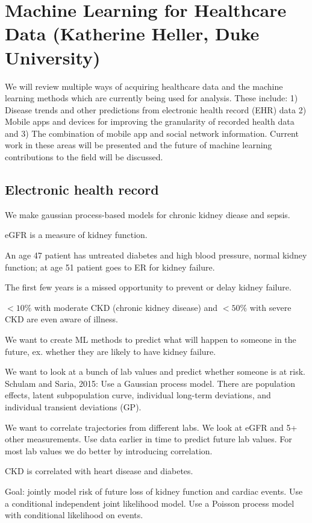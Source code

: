 \section{Machine Learning for Healthcare Data (Katherine Heller, Duke University)}

We will review multiple ways of acquiring healthcare data and the machine learning methods which are currently being used for analysis. These include: 1) Disease trends and other predictions from electronic health record (EHR) data 2) Mobile apps and devices for improving the granularity of recorded health data and 3) The combination of mobile app and social network information. Current work in these areas will be presented and the future of machine learning contributions to the field will be discussed.

\subsection{Electronic health record}

We make gaussian process-based models for chronic kidney diease and sepsis.

eGFR is a measure of kidney function. 

An age 47 patient has untreated diabetes and high blood pressure, normal kidney function; at age 51 patient goes to ER for kidney failure.

The first few years is a missed opportunity to prevent or delay kidney failure.

$<10\%$ with moderate CKD (chronic kidney disease) and $<50\%$ with severe CKD are even aware of illness.

We want to create ML methods to predict what will happen to someone in the future, ex. whether they are likely to have kidney failure. 

We want to look at a bunch of lab values and predict whether someone is at risk. Schulam and Saria, 2015: Use a Gaussian process model. There are population effects, latent subpopulation curve, individual long-term deviations, and individual transient deviations (GP).

We want to correlate trajectories from different labs.
We look at eGFR and 5+ other measurements. 
Use data earlier in time to predict future lab values. For most lab values we do better by introducing correlation.

CKD is correlated with heart disease and diabetes.

Goal: jointly model risk of future loss of kidney function and cardiac events. Use a conditional independent joint likelihood model. 
Use a Poisson process model with conditional likelihood on events.

